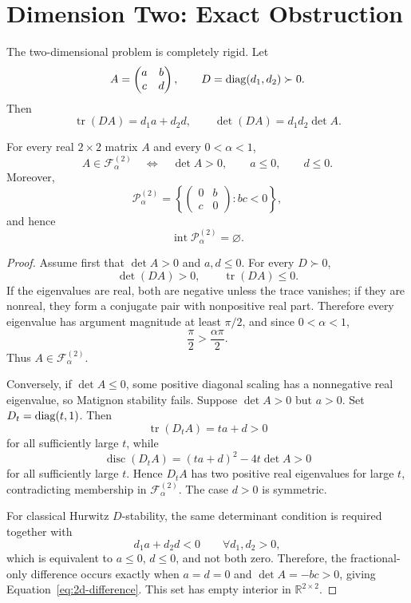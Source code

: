 \section{Dimension Two: Exact Obstruction}\label{sec:two}

The two-dimensional problem is completely rigid. Let
\[
 A=
 \begin{pmatrix}
 a&b\\
 c&d
 \end{pmatrix},
 \qquad
 D=\operatorname{diag}(d_1,d_2)\succ0.
\]
Then
\[
 \operatorname{tr}(DA)=d_1a+d_2d,
 \qquad
 \det(DA)=d_1d_2\det A.
\]

\begin{Theorem}\label{thm:2d}
For every real \(2\times2\) matrix \(A\) and every \(0<\alpha<1\),
\begin{equation}
 A\in\mathcal F_\alpha^{(2)}
 \quad\Longleftrightarrow\quad
 \det A>0,\qquad a\le0,\qquad d\le0.
 \label{eq:2d-class}
\end{equation}
Moreover,
\begin{equation}
 \mathcal P_\alpha^{(2)}
 =
 \left\{
 \begin{pmatrix}
 0&b\\
 c&0
 \end{pmatrix}
 :bc<0
 \right\},
 \label{eq:2d-difference}
\end{equation}
and hence
\[
 \operatorname{int}\mathcal P_\alpha^{(2)}=\varnothing.
\]
\end{Theorem}

\begin{proof}
Assume first that \(\det A>0\) and \(a,d\le0\). For every \(D\succ0\),
\[
 \det(DA)>0,
 \qquad
 \operatorname{tr}(DA)\le0.
\]
If the eigenvalues are real, both are negative unless the trace vanishes; if they are nonreal, they form a conjugate pair with nonpositive real part. Therefore every eigenvalue has argument magnitude at least \(\pi/2\), and since \(0<\alpha<1\),
\[
 \frac{\pi}{2}>\frac{\alpha\pi}{2}.
\]
Thus \(A\in\mathcal F_\alpha^{(2)}\).

Conversely, if \(\det A\le0\), some positive diagonal scaling has a nonnegative real eigenvalue, so Matignon stability fails. Suppose \(\det A>0\) but \(a>0\). Set \(D_t=\operatorname{diag}(t,1)\). Then
\[
 \operatorname{tr}(D_tA)=ta+d>0
\]
for all sufficiently large \(t\), while
\[
 \operatorname{disc}(D_tA)
 =
 (ta+d)^2-4t\det A>0
\]
for all sufficiently large \(t\). Hence \(D_tA\) has two positive real eigenvalues for large \(t\), contradicting membership in \(\mathcal F_\alpha^{(2)}\). The case \(d>0\) is symmetric.

For classical Hurwitz \(D\)-stability, the same determinant condition is required together with
\[
 d_1a+d_2d<0
 \qquad
 \forall d_1,d_2>0,
\]
which is equivalent to \(a\le0\), \(d\le0\), and not both zero. Therefore, the fractional-only difference occurs exactly when \(a=d=0\) and \(\det A=-bc>0\), giving Equation~\eqref{eq:2d-difference}. This set has empty interior in \(\mathbb R^{2\times2}\).
\end{proof}


